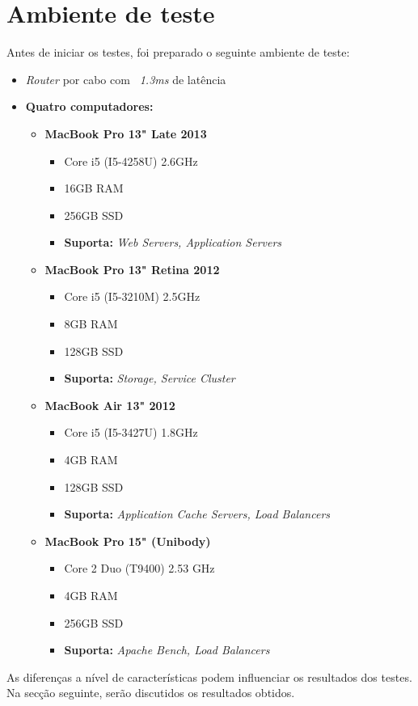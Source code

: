 \section{Ambiente de teste}

Antes de iniciar os testes, foi preparado o seguinte ambiente de teste:

\begin{itemize}
	\item \emph{\emph{Router}} por cabo com \textit{~1.3ms} de latência
	\item \textbf{Quatro computadores:}
		\begin{itemize}
			\item \textbf{MacBook Pro 13" Late 2013}
				\begin{itemize}
					\item Core i5 (I5-4258U) 2.6GHz
					\item 16GB RAM
					\item 256GB SSD
					\item \textbf{Suporta:} \emph{Web Servers, Application Servers}
				\end{itemize}

			\item \textbf{MacBook Pro 13" Retina 2012}
				\begin{itemize}
					\item Core i5 (I5-3210M) 2.5GHz
					\item 8GB RAM
					\item 128GB SSD
					\item \textbf{Suporta:} \emph{Storage, Service Cluster}
				\end{itemize}

			\item \textbf{MacBook Air 13" 2012}
				\begin{itemize}
					\item Core i5 (I5-3427U) 1.8GHz
					\item 4GB RAM
					\item 128GB SSD
					\item \textbf{Suporta:} \emph{Application Cache Servers, Load Balancers}
				\end{itemize}

			\item \textbf{MacBook Pro 15" (Unibody)}
				\begin{itemize}
					\item Core 2 Duo (T9400) 2.53 GHz
					\item 4GB RAM
					\item 256GB SSD
					\item \textbf{Suporta:} \emph{Apache Bench, Load Balancers}
				\end{itemize}
		\end{itemize}
\end{itemize}

As diferenças a nível de características podem influenciar os resultados dos testes. Na secção seguinte, serão discutidos os resultados obtidos.
